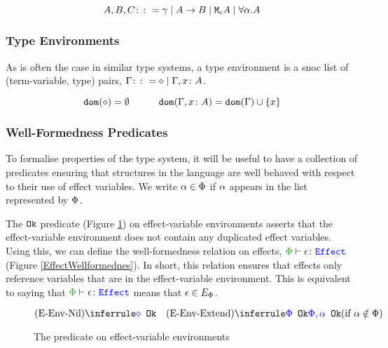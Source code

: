 \documentclass{Report}
\begin{document}
$$ A, B, C \gens \ground \mid \ab \mid \mea \mid \all{\a}{A}$$
  
\subsubsection{Type Environments}
As is often the case in similar type systems, a type environment is a snoc list of (term-variable, type) pairs, $\G \gens \nil \mid \gax$.

\begin{framed}
    \begin{definition}
        \[
        \dom{\nil} = \emptyset
        \quad\quad\quad
        \dom{\gax} =  \dom{\G}  \cup \left\{x \right\}
    \]
    
    \end{definition}      
\end{framed}


\subsubsection{Well-Formedness Predicates}


To formalise properties of the type system, it will be useful to have a collection of predicates ensuring that structures in the language are well behaved with respect to their use of effect variables. We write $\a \in \P$ if $\a$ appears in the list represented by $\P$.

The $\okt$ predicate (Figure \ref{EffectEnvOk}) on effect-variable environments asserts that the effect-variable environment does not contain any duplicated effect variables. Using this, we can define the well-formedness relation on effects, $\wellformedeffect{\P}{\e}$ (Figure \ref{EffectWellformednes}). In short, this relation ensures that effects only reference variables that are in the effect-variable environment. This is equivalent to saying that $\wellformedeffect{\P}{\e}$ means that $\e\in E_\P$.

\begin{figure}[H]
    \centering
    \begin{framed}
        \[
    \ntreerulez{\pnil}{\ok{\nil}}
\quad
    \condtreeruleI{\pextend}{\ok{\P}}{\ok{\P, \a}}{\a\notin \P}
\]
    \end{framed}
    
    \caption{The \okt\s predicate on effect-variable environments}
    \label{EffectEnvOk}
\end{figure}
\end{document}
